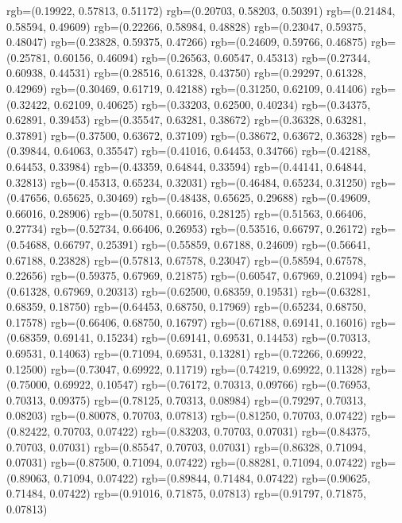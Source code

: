 {{{			rgb=(0.19922, 0.57813, 0.51172)
			rgb=(0.20703, 0.58203, 0.50391)
			rgb=(0.21484, 0.58594, 0.49609)
			rgb=(0.22266, 0.58984, 0.48828)
			rgb=(0.23047, 0.59375, 0.48047)
			rgb=(0.23828, 0.59375, 0.47266)
			rgb=(0.24609, 0.59766, 0.46875)
			rgb=(0.25781, 0.60156, 0.46094)
			rgb=(0.26563, 0.60547, 0.45313)
			rgb=(0.27344, 0.60938, 0.44531)
			rgb=(0.28516, 0.61328, 0.43750)
			rgb=(0.29297, 0.61328, 0.42969)
			rgb=(0.30469, 0.61719, 0.42188)
			rgb=(0.31250, 0.62109, 0.41406)
			rgb=(0.32422, 0.62109, 0.40625)
			rgb=(0.33203, 0.62500, 0.40234)
			rgb=(0.34375, 0.62891, 0.39453)
			rgb=(0.35547, 0.63281, 0.38672)
			rgb=(0.36328, 0.63281, 0.37891)
			rgb=(0.37500, 0.63672, 0.37109)
			rgb=(0.38672, 0.63672, 0.36328)
			rgb=(0.39844, 0.64063, 0.35547)
			rgb=(0.41016, 0.64453, 0.34766)
			rgb=(0.42188, 0.64453, 0.33984)
			rgb=(0.43359, 0.64844, 0.33594)
			rgb=(0.44141, 0.64844, 0.32813)
			rgb=(0.45313, 0.65234, 0.32031)
			rgb=(0.46484, 0.65234, 0.31250)
			rgb=(0.47656, 0.65625, 0.30469)
			rgb=(0.48438, 0.65625, 0.29688)
			rgb=(0.49609, 0.66016, 0.28906)
			rgb=(0.50781, 0.66016, 0.28125)
			rgb=(0.51563, 0.66406, 0.27734)
			rgb=(0.52734, 0.66406, 0.26953)
			rgb=(0.53516, 0.66797, 0.26172)
			rgb=(0.54688, 0.66797, 0.25391)
			rgb=(0.55859, 0.67188, 0.24609)
			rgb=(0.56641, 0.67188, 0.23828)
			rgb=(0.57813, 0.67578, 0.23047)
			rgb=(0.58594, 0.67578, 0.22656)
			rgb=(0.59375, 0.67969, 0.21875)
			rgb=(0.60547, 0.67969, 0.21094)
			rgb=(0.61328, 0.67969, 0.20313)
			rgb=(0.62500, 0.68359, 0.19531)
			rgb=(0.63281, 0.68359, 0.18750)
			rgb=(0.64453, 0.68750, 0.17969)
			rgb=(0.65234, 0.68750, 0.17578)
			rgb=(0.66406, 0.68750, 0.16797)
			rgb=(0.67188, 0.69141, 0.16016)
			rgb=(0.68359, 0.69141, 0.15234)
			rgb=(0.69141, 0.69531, 0.14453)
			rgb=(0.70313, 0.69531, 0.14063)
			rgb=(0.71094, 0.69531, 0.13281)
			rgb=(0.72266, 0.69922, 0.12500)
			rgb=(0.73047, 0.69922, 0.11719)
			rgb=(0.74219, 0.69922, 0.11328)
			rgb=(0.75000, 0.69922, 0.10547)
			rgb=(0.76172, 0.70313, 0.09766)
			rgb=(0.76953, 0.70313, 0.09375)
			rgb=(0.78125, 0.70313, 0.08984)
			rgb=(0.79297, 0.70313, 0.08203)
			rgb=(0.80078, 0.70703, 0.07813)
			rgb=(0.81250, 0.70703, 0.07422)
			rgb=(0.82422, 0.70703, 0.07422)
			rgb=(0.83203, 0.70703, 0.07031)
			rgb=(0.84375, 0.70703, 0.07031)
			rgb=(0.85547, 0.70703, 0.07031)
			rgb=(0.86328, 0.71094, 0.07031)
			rgb=(0.87500, 0.71094, 0.07422)
			rgb=(0.88281, 0.71094, 0.07422)
			rgb=(0.89063, 0.71094, 0.07422)
			rgb=(0.89844, 0.71484, 0.07422)
			rgb=(0.90625, 0.71484, 0.07422)
			rgb=(0.91016, 0.71875, 0.07813)
			rgb=(0.91797, 0.71875, 0.07813)
}}}
